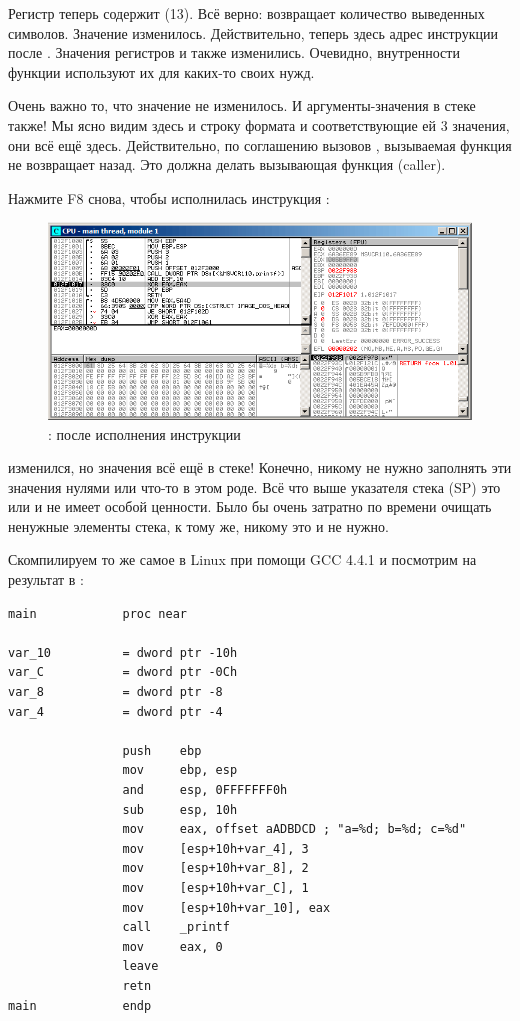 Регистр \EAX теперь содержит  (13).
Всё верно: \printf возвращает количество выведенных символов.
Значение \EIP изменилось. Действительно, теперь здесь адрес инструкции после .
Значения регистров \ECX и \EDX также изменились.
Очевидно, внутренности функции \printf используют их для каких-то своих нужд.

Очень важно то, что значение \ESP не изменилось. И аргументы-значения в стеке также!
Мы ясно видим здесь и строку формата и соответствующие ей 3 значения, они всё ещё здесь.
Действительно, по соглашению вызовов , вызываемая функция не возвращает \ESP назад.
Это должна делать вызывающая функция (\gls{caller}).

\clearpage
Нажмите F8 снова, чтобы исполнилась инструкция :

\begin{figure}[H]
\centering
\includegraphics[scale=\FigScale]{patterns/03_printf/x86/olly3_4.png}
\caption{\olly: после исполнения инструкции }
\label{fig:printf3_olly_4}
\end{figure}

\ESP изменился, но значения всё ещё в стеке!
Конечно, никому не нужно заполнять эти значения нулями или что-то в этом роде.
Всё что выше указателя стека (\ac{SP}) 
это  или \IT{\garbage{}} и не имеет особой ценности.
Было бы очень затратно по времени очищать ненужные элементы стека, к тому же, никому это и не нужно.


Скомпилируем то же самое в Linux при помощи GCC 4.4.1 и посмотрим на результат в \IDA:

\begin{lstlisting}
main            proc near

var_10          = dword ptr -10h
var_C           = dword ptr -0Ch
var_8           = dword ptr -8
var_4           = dword ptr -4

                push    ebp
                mov     ebp, esp
                and     esp, 0FFFFFFF0h
                sub     esp, 10h
                mov     eax, offset aADBDCD ; "a=%d; b=%d; c=%d"
                mov     [esp+10h+var_4], 3
                mov     [esp+10h+var_8], 2
                mov     [esp+10h+var_C], 1
                mov     [esp+10h+var_10], eax
                call    _printf
                mov     eax, 0
                leave
                retn
main            endp
\end{lstlisting}

